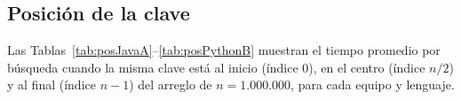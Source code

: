 \documentclass[11pt,a4paper]{article}
\begin{document}
\subsection{Posici\'on de la clave}

Las Tablas~\ref{tab:posJavaA}--\ref{tab:posPythonB} muestran el tiempo promedio por b\'usqueda cuando la misma
clave est\'a al inicio (\'indice 0), en el centro (\'indice $n/2$) y al final (\'indice $n-1$) del arreglo de
$n=1.000.000$, para cada equipo y lenguaje.

\begin{table}[htbp]
\centering
\caption{Equipo A, Java: tiempo promedio por b\'usqueda seg\'un la posici\'on de la clave ($n=1.000.000$).}\label{tab:posJavaA}

\end{table}
\begin{table}[htbp]
\centering
\caption{Equipo A, Python: tiempo promedio por b\'usqueda seg\'un la posici\'on de la clave ($n=1.000.000$).}\label{tab:posPythonA}

\end{table}
\begin{table}[htbp]
\centering
\caption{Equipo B, Java: tiempo promedio por b\'usqueda seg\'un la posici\'on de la clave ($n=1.000.000$).}\label{tab:posJavaB}

\end{table}
\begin{table}[htbp]
\centering
\caption{Equipo B, Python: tiempo promedio por b\'usqueda seg\'un la posici\'on de la clave ($n=1.000.000$).}\label{tab:posPythonB}

\end{table}
\end{document}
